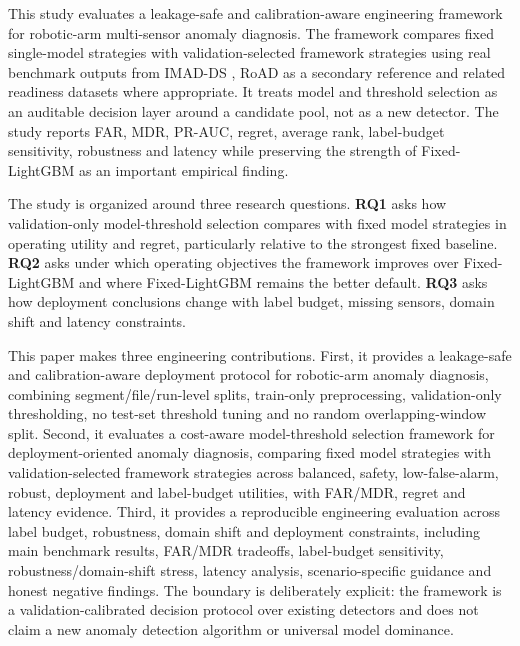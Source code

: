 This study evaluates a leakage-safe and calibration-aware engineering framework for robotic-arm multi-sensor anomaly diagnosis. The framework compares fixed single-model strategies with validation-selected framework strategies using real benchmark outputs from IMAD-DS \cite{Augusti2024IMADDS}, RoAD as a secondary reference \cite{Gaiardelli2023RoAD} and related readiness datasets where appropriate. It treats model and threshold selection as an auditable decision layer around a candidate pool, not as a new detector. The study reports FAR, MDR, PR-AUC, regret, average rank, label-budget sensitivity, robustness and latency while preserving the strength of Fixed-\allowbreak LightGBM as an important empirical finding.

The study is organized around three research questions. \textbf{RQ1} asks how validation-only model-threshold selection compares with fixed model strategies in operating utility and regret, particularly relative to the strongest fixed baseline. \textbf{RQ2} asks under which operating objectives the framework improves over Fixed-\allowbreak LightGBM and where Fixed-\allowbreak LightGBM remains the better default. \textbf{RQ3} asks how deployment conclusions change with label budget, missing sensors, domain shift and latency constraints.

This paper makes three engineering contributions. First, it provides a leakage-safe and calibration-aware deployment protocol for robotic-arm anomaly diagnosis, combining segment/file/run-level splits, train-only preprocessing, validation-only thresholding, no test-set threshold tuning and no random overlapping-window split. Second, it evaluates a cost-aware model-threshold selection framework for deployment-oriented anomaly diagnosis, comparing fixed model strategies with validation-selected framework strategies across balanced, safety, low-false-alarm, robust, deployment and label-budget utilities, with FAR/MDR, regret and latency evidence. Third, it provides a reproducible engineering evaluation across label budget, robustness, domain shift and deployment constraints, including main benchmark results, FAR/MDR tradeoffs, label-budget sensitivity, robustness/domain-shift stress, latency analysis, scenario-specific guidance and honest negative findings. The boundary is deliberately explicit: the framework is a validation-calibrated decision protocol over existing detectors and does not claim a new anomaly detection algorithm or universal model dominance.



